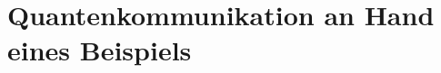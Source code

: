 \section{Quantenkommunikation an Hand eines Beispiels}
\begin{frame}[allowframebreaks]
	
\end{frame}